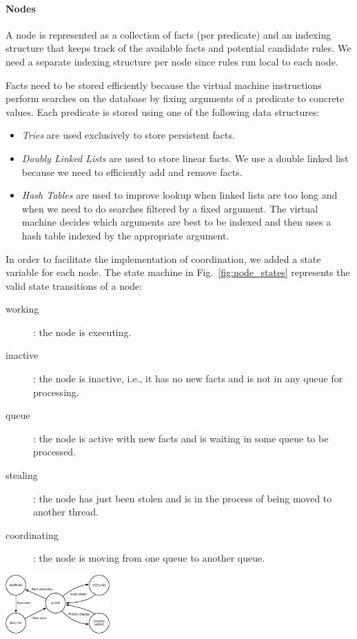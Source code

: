 \paragraph{Nodes} 
A node is represented as a collection of facts (per predicate) and an indexing structure that
keeps track of the available facts and potential candidate rules. We need
a separate indexing structure per node since rules run local to each node.

Facts need to be stored efficiently because the virtual machine instructions
perform searches on the database by fixing arguments of a predicate to concrete
values. Each predicate is stored using one of the following data structures:

\begin{itemize}
\item \emph{Tries} are used exclusively to store persistent facts.
\item \emph{Doubly Linked Lists} are used to store 
  linear facts. We use a double linked list because we need to efficiently add
  and remove facts.
\item \emph{Hash Tables} are used to improve lookup when 
  linked lists are too long and when we need to do searches filtered by
  a fixed argument. The virtual machine decides which arguments are
  best to be indexed and then uses a hash table
  indexed by the appropriate argument.
\end{itemize}

In order to facilitate the implementation of coordination, we added a state
variable for each node. The state machine in
Fig.~\ref{fig:node_states} represents the valid state transitions of a node:

\begin{description}
   \item[working]: the node is executing.
   \item[inactive]: the node is inactive, i.e., it has no new facts and is not in any
   queue for processing.
   \item[queue]: the node is active with new facts and is waiting in some queue
   to be processed.
   \item[stealing]: the node has just been stolen and is in the process of being
   moved to another thread.
   \item[coordinating]: the node is moving from one queue to another queue.
\end{description}

\begin{topfig}
   \centering
   \includegraphics[width=0.3\textwidth]{node_states.pdf}
\vspace*{.5ex}
\end{topfig}

